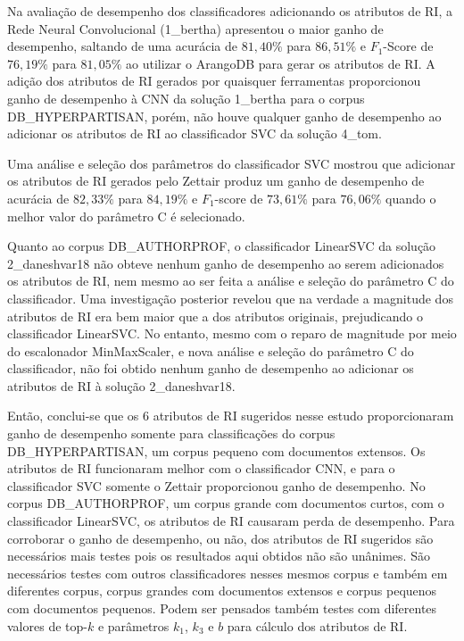 Na avaliação de desempenho dos classificadores adicionando os atributos de RI, a Rede Neural Convolucional (1\_bertha) apresentou o maior ganho de desempenho, saltando de uma acurácia de $81,40\%$ para $86,51\%$ e $F_1$-Score de $76,19\%$ para $81,05\%$ ao utilizar o ArangoDB para gerar os atributos de RI.
A adição dos atributos de RI gerados por quaisquer ferramentas proporcionou ganho de desempenho à CNN da solução 1\_bertha para o corpus DB\_HYPERPARTISAN, porém, não houve qualquer ganho de desempenho ao adicionar os atributos de RI ao classificador SVC da solução 4\_tom.

Uma análise e seleção dos parâmetros do classificador SVC mostrou que adicionar os atributos de RI gerados pelo Zettair produz um ganho de desempenho de acurácia de $82,33\%$ para $84,19\%$ e $F_1$-score de $73,61\%$ para $76,06\%$ quando o melhor valor do parâmetro C é selecionado.

Quanto ao corpus DB\_AUTHORPROF, o classificador LinearSVC da solução 2\_daneshvar18 não obteve nenhum ganho de desempenho ao serem adicionados os atributos de RI, nem mesmo ao ser feita a análise e seleção do parâmetro C do classificador.
Uma investigação posterior revelou que na verdade a magnitude dos atributos de RI era bem maior que a dos atributos originais, prejudicando o classificador LinearSVC.
No entanto, mesmo com o reparo de magnitude por meio do escalonador MinMaxScaler, e nova análise e seleção do parâmetro C do classificador, não foi obtido nenhum ganho de desempenho ao adicionar os atributos de RI à solução 2\_daneshvar18.

Então, conclui-se que os 6 atributos de RI sugeridos nesse estudo proporcionaram ganho de desempenho somente para classificações do corpus DB\_HYPERPARTISAN, um corpus pequeno com documentos extensos.
Os atributos de RI funcionaram melhor com o classificador CNN, e para o classificador SVC somente o Zettair proporcionou ganho de desempenho.
No corpus DB\_AUTHORPROF, um corpus grande com documentos curtos, com o classificador LinearSVC, os atributos de RI causaram perda de desempenho.
Para corroborar o ganho de desempenho, ou não, dos atributos de RI sugeridos são necessários mais testes pois os resultados aqui obtidos não são unânimes.
São necessários testes com outros classificadores nesses mesmos corpus e também em diferentes corpus, corpus grandes com documentos extensos e corpus pequenos com documentos pequenos. 
Podem ser pensados também testes com diferentes valores de top-$k$ e parâmetros $k_1$, $k_3$ e $b$ para cálculo dos atributos de RI.

